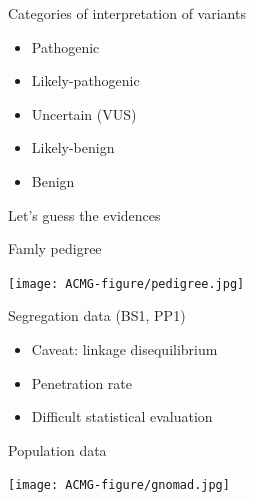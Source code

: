 \documentclass[
  ignorenonframetext,
]{beamer}
\providecommand{\tightlist}{%
  \setlength{\itemsep}{0pt}\setlength{\parskip}{0pt}}
\begin{document}
\begin{frame}{Categories of interpretation of variants}
\protect\hypertarget{categories-of-interpretation-of-variants}{}

\begin{itemize}
\tightlist
\item
  Pathogenic\\
\item
  Likely-pathogenic\\
\item
  Uncertain (VUS)\\
\item
  Likely-benign\\
\item
  Benign
\end{itemize}

\end{frame}

\begin{frame}{Let's guess the evidences}
\protect\hypertarget{lets-guess-the-evidences}{}

\end{frame}

\begin{frame}{Famly pedigree}
\protect\hypertarget{famly-pedigree}{}

\texttt{[image: ACMG-figure/pedigree.jpg]}

\end{frame}

\begin{frame}{Segregation data (BS1, PP1)}
\protect\hypertarget{segregation-data-bs1-pp1}{}

\begin{itemize}
\tightlist
\item
  Caveat: linkage disequilibrium\\
\item
  Penetration rate\\
\item
  Difficult statistical evaluation
\end{itemize}

\end{frame}

\begin{frame}{Population data}
\protect\hypertarget{population-data}{}

\texttt{[image: ACMG-figure/gnomad.jpg]}

\end{frame}
\end{document}
